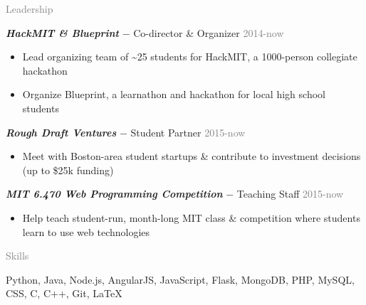 \documentclass[11pt]{article}
\newcommand{\rsection}[1]{\vspace{1.5em}\textcolor{gray}{\Large \robotoslab #1}\vspace{0.5em}}
\newcommand{\bt}[1]{\textit{\textbf{#1}}} %
\newcommand{\gap}[0]{\vspace{0.5em}} %
\newcommand{\dash}[0]{ $-$ } %
\newcommand{\gray}[1]{\textcolor{gray}{#1}}
\begin{document}
\rsection{Leadership}

\bt{HackMIT \& Blueprint}\dash Co-director \& Organizer \hfill \gray{2014-now}

\begin{itemize}
\item Lead organizing team of \textasciitilde 25 students for HackMIT, a 1000-person collegiate hackathon
\item Organize Blueprint, a learnathon and hackathon for local high school students
\end{itemize}

\gap

\bt{Rough Draft Ventures}\dash Student Partner \hfill \gray{2015-now}

\begin{itemize}
\item Meet with Boston-area student startups \& contribute to investment decisions (up to \$25k funding)
\end{itemize}

\gap

\bt{MIT 6.470 Web Programming Competition}\dash Teaching Staff \hfill \gray{2015-now}

\begin{itemize}
\item Help teach student-run, month-long MIT class \& competition where students learn to use web technologies
\end{itemize}

\rsection{Skills}

Python, Java, Node.js, AngularJS, JavaScript, Flask, MongoDB, PHP, MySQL, CSS, C, C++, Git, {\selectfont\LaTeX}
\end{document}
